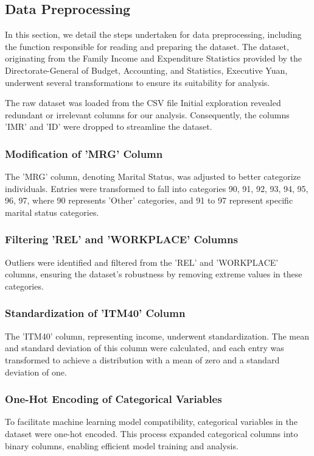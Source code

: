 \documentclass[twocolumn]{article}
\begin{document}
	\subsection{Data Preprocessing}
In this section, we detail the steps undertaken for data preprocessing, including the function responsible for reading and preparing the dataset. The dataset, originating from the Family Income and Expenditure Statistics provided by the Directorate-General of Budget, Accounting, and Statistics, Executive Yuan, underwent several transformations to ensure its suitability for analysis.

The raw dataset was loaded from the CSV file Initial exploration revealed redundant or irrelevant columns for our analysis. Consequently, the columns 'IMR' and 'ID' were dropped to streamline the dataset.

		\subsubsection{Modification of 'MRG' Column}
The 'MRG' column, denoting Marital Status, was adjusted to better categorize individuals. Entries were transformed to fall into categories 90, 91, 92, 93, 94, 95, 96, 97, where 90 represents 'Other' categories, and 91 to 97 represent specific marital status categories.

		\subsubsection{Filtering 'REL' and 'WORKPLACE' Columns}
Outliers were identified and filtered from the 'REL' and 'WORKPLACE' columns, ensuring the dataset's robustness by removing extreme values in these categories.

		\subsubsection{Standardization of 'ITM40' Column}
The 'ITM40' column, representing income, underwent standardization. The mean and standard deviation of this column were calculated, and each entry was transformed to achieve a distribution with a mean of zero and a standard deviation of one.

		\subsubsection{One-Hot Encoding of Categorical Variables}
To facilitate machine learning model compatibility, categorical variables in the dataset were one-hot encoded. This process expanded categorical columns into binary columns, enabling efficient model training and analysis.
\end{document}
